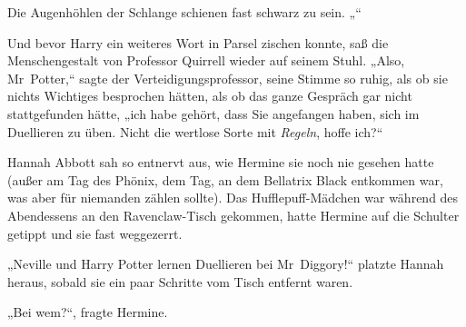 Die Augenhöhlen der Schlange schienen fast schwarz zu sein. „“

Und bevor Harry ein weiteres Wort in Parsel zischen konnte, saß die Menschengestalt von Professor Quirrell wieder auf seinem Stuhl. „Also, Mr~Potter,“ sagte der Verteidigungsprofessor, seine Stimme so ruhig, als ob sie nichts Wichtiges besprochen hätten, als ob das ganze Gespräch gar nicht stattgefunden hätte, „ich habe gehört, dass Sie angefangen haben, sich im Duellieren zu üben. Nicht die wertlose Sorte mit \emph{Regeln}, hoffe ich?“

\later

Hannah Abbott sah so entnervt aus, wie Hermine sie noch nie gesehen hatte (außer am Tag des Phönix, dem Tag, an dem Bellatrix Black entkommen war, was aber für niemanden zählen sollte). Das Hufflepuff-Mädchen war während des Abendessens an den Ravenclaw-Tisch gekommen, hatte Hermine auf die Schulter getippt und sie fast weggezerrt.

„Neville und Harry Potter lernen Duellieren bei Mr~Diggory!“ platzte Hannah heraus, sobald sie ein paar Schritte vom Tisch entfernt waren.

„Bei wem?“, fragte Hermine.

